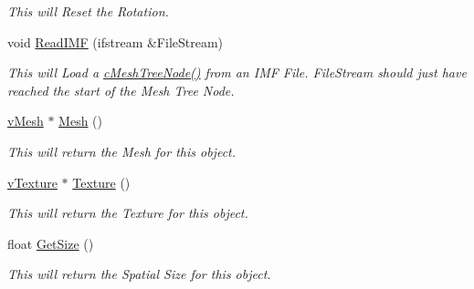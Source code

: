 \begin{DoxyCompactItemize}
\begin{DoxyCompactList}\small\item\em This will Reset the Rotation. \item\end{DoxyCompactList}\item 
void \hyperlink{classc_mesh_tree_node_a1ca09fa05700321ca076d327fa99220b}{ReadIMF} (ifstream \&FileStream)
\begin{DoxyCompactList}\small\item\em This will Load a \hyperlink{classc_mesh_tree_node_aa0506651f17427bfdbababeb406eb8f3}{cMeshTreeNode()} from an IMF File. FileStream should just have reached the start of the Mesh Tree Node. \item\end{DoxyCompactList}\item 
\hyperlink{classv_mesh}{vMesh} $\ast$ \hyperlink{classc_mesh_tree_node_a3056c26a6ce6ba8565dccef3ea15f5b5}{Mesh} ()
\begin{DoxyCompactList}\small\item\em This will return the Mesh for this object. \item\end{DoxyCompactList}\item 
\hyperlink{classv_texture}{vTexture} $\ast$ \hyperlink{classc_mesh_tree_node_ac0f2bde8c7a25e243841f6b4edcdeb82}{Texture} ()
\begin{DoxyCompactList}\small\item\em This will return the Texture for this object. \item\end{DoxyCompactList}\item 
float \hyperlink{classc_mesh_tree_node_a9e00261118c3ed9076abc38907a2e8d3}{GetSize} ()
\begin{DoxyCompactList}\small\item\em This will return the Spatial Size for this object. \item\end{DoxyCompactList}\end{DoxyCompactItemize}
